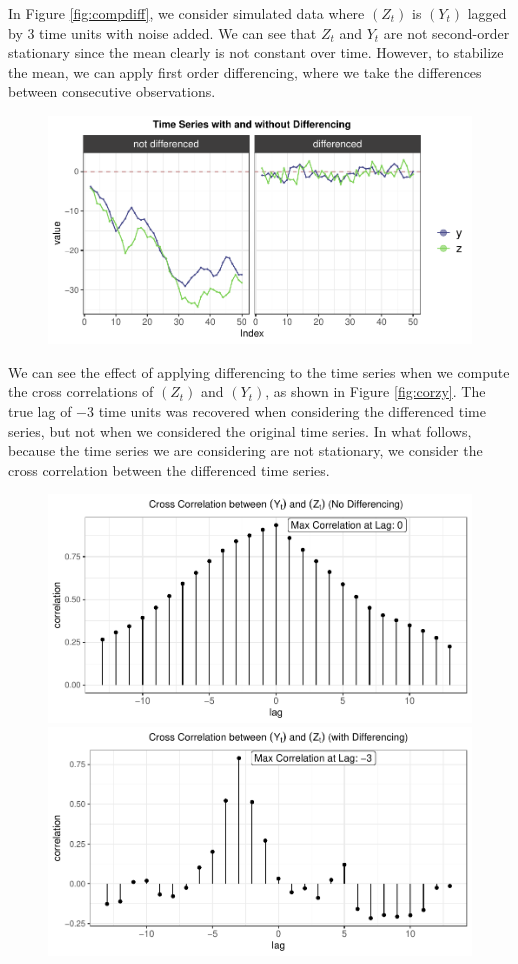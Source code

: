 \documentclass[12pt,twoside]{smiththesis}
\begin{document}
In Figure \ref{fig:compdiff}, we consider simulated data where \((Z_t)\) is \((Y_t)\) lagged by 3 time units with noise added. We can see that \(Z_t\) and \(Y_t\) are not second-order stationary since the mean clearly is not constant over time. However, to stabilize the mean, we can apply first order differencing, where we take the differences between consecutive observations.
\begin{figure}
\includegraphics[width=1\linewidth]{thesis_files/figure-latex/unnamed-chunk-80-1} \caption{\label{fig:compdiff}}\label{fig:unnamed-chunk-80}
\end{figure}
We can see the effect of applying differencing to the time series when we compute the cross correlations of \((Z_t)\) and \((Y_t)\), as shown in Figure \ref{fig:corzy}. The true lag of \(-3\) time units was recovered when considering the differenced time series, but not when we considered the original time series. In what follows, because the time series we are considering are not stationary, we consider the cross correlation between the differenced time series.
\vspace{5 cm}
\begin{figure}
\includegraphics[width=0.45\linewidth]{thesis_files/figure-latex/unnamed-chunk-81-1} \includegraphics[width=0.45\linewidth]{thesis_files/figure-latex/unnamed-chunk-81-2} \caption{\label{fig:corzy}}\label{fig:unnamed-chunk-81}
\end{figure}
\end{document}
